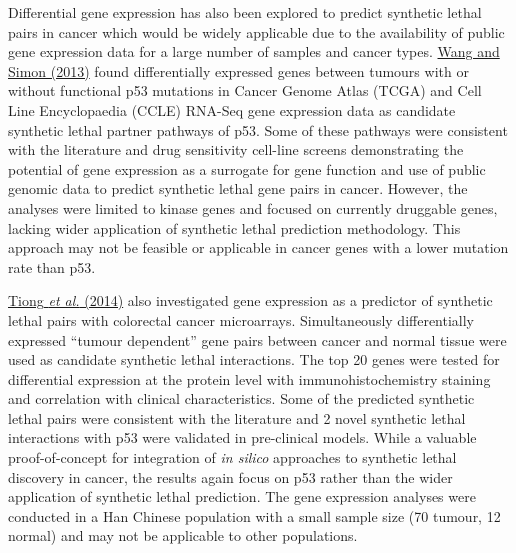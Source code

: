 Differential gene expression has also been explored to predict synthetic lethal pairs in cancer which would be widely applicable due to the availability of public gene expression data for a large number of samples and cancer types. \hyperlink{ENREF109}{Wang and Simon (2013)} found differentially expressed genes between tumours with or without functional p53 mutations in Cancer Genome Atlas (TCGA) and Cell Line Encyclopaedia (CCLE) RNA-Seq gene expression data as candidate synthetic lethal partner pathways of p53. Some of these pathways were consistent with the literature and drug sensitivity cell-line screens demonstrating the potential of gene expression as a surrogate for gene function and use of public genomic data to predict synthetic lethal gene pairs in cancer. However, the analyses were limited to kinase genes and focused on currently druggable genes, lacking wider application of synthetic lethal prediction methodology. This approach may not be feasible or applicable in cancer genes with a lower mutation rate than p53.  

\hyperlink{ENREF95}{Tiong}\hyperlink{ENREF95}{\textit{ et al.}}\hyperlink{ENREF95}{ (2014)} also investigated gene expression as a predictor of synthetic lethal pairs with colorectal cancer microarrays. Simultaneously differentially expressed {\textquotedblleft}tumour dependent{\textquotedblright} gene pairs between cancer and normal tissue were used as candidate synthetic lethal interactions. The top 20 genes were tested for differential expression at the protein level with immunohistochemistry staining and correlation with clinical characteristics. Some of the predicted synthetic lethal pairs were consistent with the literature and 2 novel synthetic lethal interactions with p53 were validated in pre-clinical models. While a valuable proof-of-concept for integration of \textit{in silico} approaches to synthetic lethal discovery in cancer, the results again focus on p53 rather than the wider application of synthetic lethal prediction. The gene expression analyses were conducted in a Han Chinese population with a small sample size (70 tumour, 12 normal) and may not be applicable to other populations.  

